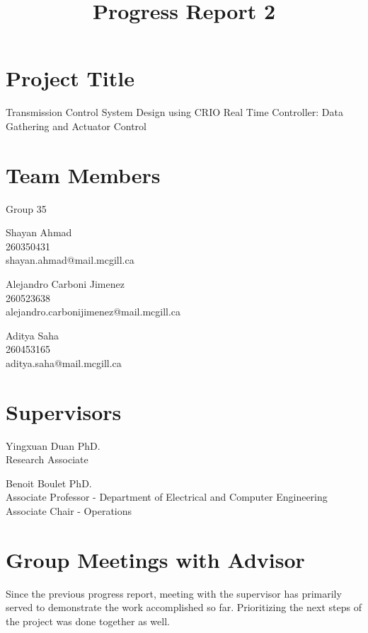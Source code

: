 \documentclass[12pt]{article}
\begin{document}
\title{Progress Report 2}
\date{}
\maketitle
\section*{Project Title} 
Transmission Control System Design using CRIO Real Time Controller:
Data Gathering and Actuator Control
\section*{Team Members}
Group 35 \newline

\hangindent=17.62482pt
Shayan Ahmad \\
260350431 \\
shayan.ahmad@mail.mcgill.ca \newline

\hangindent=17.62482pt
Alejandro Carboni Jimenez \\
260523638 \\
alejandro.carbonijimenez@mail.mcgill.ca \newline

\hangindent=17.62482pt
Aditya Saha \\
260453165 \\
aditya.saha@mail.mcgill.ca

\section*{Supervisors}
\hangindent=17.62482pt
Yingxuan Duan PhD.\\ 
Research Associate\newline 

\hangindent=17.62482pt
Benoit Boulet PhD.\\
Associate Professor - Department of Electrical and Computer Engineering\\
Associate Chair - Operations

\newpage
\section*{Group Meetings with Advisor}
Since the previous progress report, meeting with the supervisor has primarily
served to demonstrate the work accomplished so far. Prioritizing the next steps
of the project was done together as well. 
\end{document}
